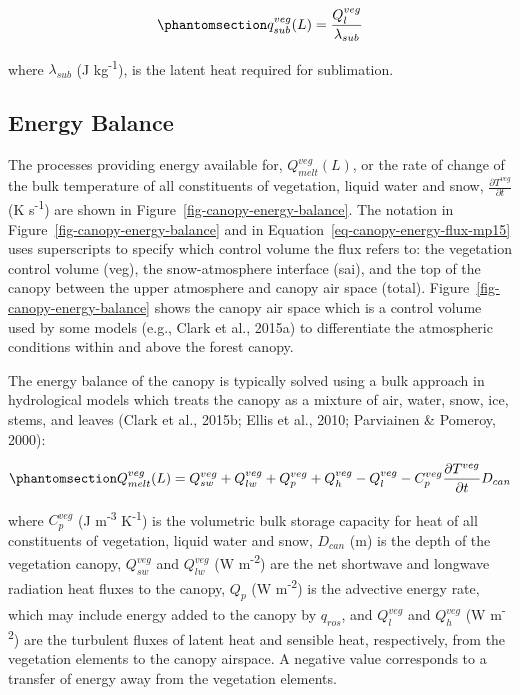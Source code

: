 \documentclass[
  letterpaper,
]{tex/uofsthesis-cs}
\begin{document}
\begin{equation}\phantomsection\label{eq-lsub}{
q_{sub}^{veg}(L) = \frac{Q_{l}^{veg}}{\lambda_{sub}}
}\end{equation}

where \(\lambda_{sub}\) (J kg\textsuperscript{-1}), is the latent heat
required for sublimation.

\subsection{Energy Balance}\label{energy-balance}

The processes providing energy available for, \(Q_{melt}^{veg}(L)\), or
the rate of change of the bulk temperature of all constituents of
vegetation, liquid water and snow,
\(\frac{\partial T^{veg}}{\partial t}\) (K s\textsuperscript{-1}) are
shown in Figure~\ref{fig-canopy-energy-balance}. The notation in
Figure~\ref{fig-canopy-energy-balance} and in
Equation~\ref{eq-canopy-energy-flux-mp15} uses superscripts to specify
which control volume the flux refers to: the vegetation control volume
(veg), the snow-atmosphere interface (sai), and the top of the canopy
between the upper atmosphere and canopy air space (total).
Figure~\ref{fig-canopy-energy-balance} shows the canopy air space which
is a control volume used by some models (e.g., Clark et al., 2015a) to
differentiate the atmospheric conditions within and above the forest
canopy.

The energy balance of the canopy is typically solved using a bulk
approach in hydrological models which treats the canopy as a mixture of
air, water, snow, ice, stems, and leaves (Clark et al., 2015b; Ellis et
al., 2010; Parviainen \& Pomeroy, 2000):

\begin{equation}\phantomsection\label{eq-canopy-energy-flux-mp15}{
Q_{melt}^{veg}(L) = 
Q_{sw}^{veg} +
Q_{lw}^{veg} +
Q_{p}^{veg} + Q_{h}^{veg} - Q_{l}^{veg} - C_p^{veg} \frac{\partial T^{veg}}{\partial t} D_{can}
}\end{equation}

where \(C_p^{veg}\) (J m\textsuperscript{-3} K\textsuperscript{-1}) is
the volumetric bulk storage capacity for heat of all constituents of
vegetation, liquid water and snow, \(D_{can}\) (m) is the depth of the
vegetation canopy, \(Q_{sw}^{veg}\) and \(Q_{lw}^{veg}\) (W
m\textsuperscript{-2}) are the net shortwave and longwave radiation heat
fluxes to the canopy, \(Q_p\) (W m\textsuperscript{-2}) is the advective
energy rate, which may include energy added to the canopy by
\(q_{ros}\), and \(Q_{l}^{veg}\) and \(Q_{h}^{veg}\) (W
m\textsuperscript{-2}) are the turbulent fluxes of latent heat and
sensible heat, respectively, from the vegetation elements to the canopy
airspace. A negative value corresponds to a transfer of energy away from
the vegetation elements.
\end{document}
